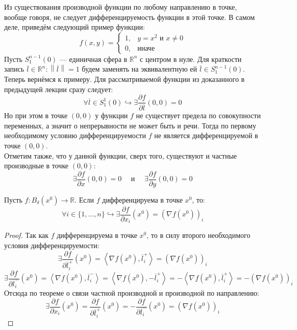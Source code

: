 \documentclass[11pt]{article}
\begin{document}
\begin{remark}
    Из существования производной функции по любому направлению в точке, вообще говоря, не следует дифференцируемость функции в этой точке. В самом деле, 
    приведём следующий пример функции:
    \begin{equation*}
        f(x, y) = 
        \begin{cases}
            1, & y = x^2 \text{ и } x \neq 0 \\
            0, & \text{иначе}
        \end{cases}
    \end{equation*}
    Пусть $S_1^{n - 1}(0)$ --- единичная сфера в $\mathbb{R}^n$ с центром в нуле. Для краткости запись $\overline{l} \in \mathbb{R}^n: \left\lVert \overline{l} \right\rVert = 1$ будем 
    заменять на эквивалентную ей $\overline{l} \in S_1^{n - 1}(0)$. Теперь вернёмся к примеру. Для рассматриваемой функции из доказанного в предыдущей лекции сразу следует:
    \[\forall \overline{l} \in S_1^1(0) \hookrightarrow \exists \frac{\partial f}{\partial \overline{l}} (0, 0) = 0\]
    Но при этом в точке $(0, 0)$ у функции $f$ не существует предела по совокупности переменных, а значит о непрерывности не может быть и речи.
    Тогда по первому необходимому условию дифференцируемости $f$ не является дифференцируемой в точке $(0, 0)$. 
    \\
    Отметим также, что у данной функции, сверх того, существуют и частные производные в точке $(0, 0)$:
    \[\exists \frac{\partial f}{\partial x} (0, 0) = 0 \quad \text{ и } \quad \exists \frac{\partial f}{\partial y} (0, 0) = 0\]
\end{remark}

\begin{theorem}
    Пусть $f \colon B_{\delta} \left(x^0\right) \to \mathbb{R}$. Если $f$ дифференцируема в точке $x^0$, то:
    \[\forall i \in \{1, \ldots, n\} \hookrightarrow \exists \frac{\partial f}{\partial x_i} \left(x^0\right) = \left(\nabla f\left(x^0\right)\right)_i\]
\end{theorem}

\begin{proof}
    Так как $f$ дифференцируема в точке $x^0$, то в силу второго необходимого условия дифференцируемости:
    \[\exists \frac{\partial f}{\partial \overline{l}_i^{+}}\left(x^0\right) = \left\langle \nabla f \left(x^0\right), \overline{l}_i^{+}\right\rangle = \left(\nabla f\left(x^0\right)\right)_i\]
    \[\exists \frac{\partial f}{\partial \overline{l}_i^{-}}\left(x^0\right) = \left\langle \nabla f \left(x^0\right), \overline{l}_i^{-}\right\rangle = \left\langle \nabla f \left(x^0\right), -\overline{l}_i^{+}\right\rangle = -\left\langle \nabla f \left(x^0\right), \overline{l}_i^{+}\right\rangle = - \left(\nabla f\left(x^0\right)\right)_i\]
    Отсюда по теореме о связи частной производной и производной по направлению:
    \[\exists \frac{\partial f}{\partial x_i} \left(x^0\right) = \frac{\partial f}{\partial \overline{l}_i^{+}}\left(x^0\right) = - \frac{\partial f}{\partial \overline{l}_i^{-}}\left(x^0\right) = \left(\nabla f\left(x^0\right)\right)_i\]
\end{proof}
\end{document}
